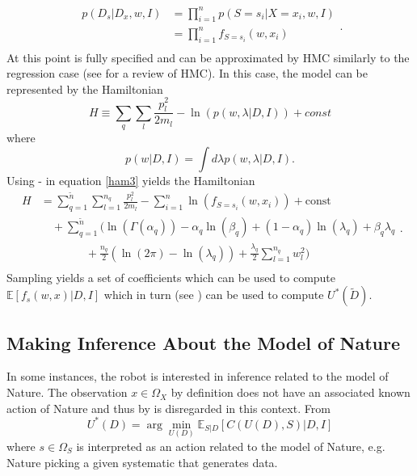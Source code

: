 \begin{equation}
	\begin{split}
		p(D_s|D_x,w,I) &=\prod_{i=1}^{n}p(S = s_i|X = x_i,w,I)\\
		&=\prod_{i=1}^{n}f_{S = s_i}(w,x_i)\\
	\end{split}.
	\label{lik}
\end{equation}
At this point  is fully specified and can be approximated by HMC similarly to the regression case (see  for a review of HMC). In this case, the model can be represented by the Hamiltonian 
\begin{equation}
	H \equiv  \sum_{q}\sum_{l}\frac{p_{l}^2}{2m_{l}}-\ln(p(w,\lambda|D,I))+const
	\label{ham3}
\end{equation}
where
\begin{equation}
	p(w|D,I) = \int d\lambda p(w,\lambda|D,I).
\end{equation}
Using - in equation \eqref{ham3} yields the Hamiltonian
\begin{equation}
	\begin{split}
		H&=\sum_{q=1}^{\tilde{n}}\sum_{l=1}^{n_q}\frac{p_{l}^2}{2m_{l}}-\sum_{i=1}^{n}\ln(f_{S = s_i}(w,x_i))+\text{const}\\
		&\quad+\sum_{q=1}^{\tilde{n}}\bigg(\ln(\Gamma(\alpha_q))-\alpha_q\ln(\beta_q)+(1-\alpha_q)\ln(\lambda_q)+\beta_q\lambda_q\\
		&\qquad \qquad+\frac{n_q}{2}(\ln(2\pi)-\ln(\lambda_q))+\frac{\lambda_q}{2}\sum_{l=1}^{n_q}w_l^2\bigg)\\
	\end{split}.
	\label{ham2}
\end{equation}
Sampling  yields a set of coefficients which can be used to compute $\mathbb{E}[f_s(w,x)|D,I]$ which in turn (see ) can be used to compute $U^*(\tilde{D})$.


\subsection{Making Inference About the Model of Nature}
In some instances, the robot is interested in inference related to the model of Nature. The observation $x\in \Omega_X$ by definition does not have an associated known action of Nature and thus by  is disregarded in this context. From 
\begin{equation}
	U^*(D) = \arg\min_{U(D)} \mathbb{E}_{S|D}[C(U(D), S)|D,I]
	\label{eq:best_decision}
\end{equation}
where $s \in \Omega_S$ is interpreted as an action related to the model of Nature, e.g. Nature picking a given systematic that generates data.


